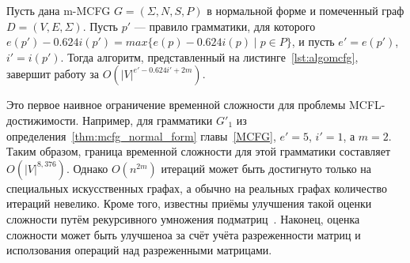 \begin{theorem}\label{thm:complexity}
	Пусть дана m-MCFG $G = (\Sigma, N, S, P)$ в нормальной форме и помеченный граф $D =(V, E, \Sigma)$. Пусть $p'$ --- правило грамматики, для которого $e(p') - 0.624i(p') = max\{e(p) - 0.624i(p) \mid p\in P\}$, и пусть $e' = e(p')$, $i' = i(p')$. Тогда алгоритм, представленный на листинге~\ref{lst:algomcfg}, завершит работу за $O(|V|^{e' - 0.624i' + 2m})$.
\end{theorem}

Это первое наивное ограничение временной сложности для проблемы MCFL-достижимости. Например, для грамматики $G'_1$ из определения~\ref{thm:mcfg_normal_form} главы~\ref{MCFG}, $e' = 5$, $i' = 1$, а $m = 2$. Таким образом, граница временной сложности для этой грамматики составляет $O(|V|^{8,376})$. Однако $O(n^{2m})$ итераций может быть достигнуто только на специальных искусственных графах, а обычно на реальных графах количество итераций невелико. Кроме того, известны приёмы улучшения такой оценки сложности путём рекурсивного умножения подматриц~\cite{Valiant:1975:GCR:1739932.1740048}. Наконец, оценка сложности может быть улучшеноа за счёт учёта разреженности матриц и исползования операций над разреженными матрицами.
